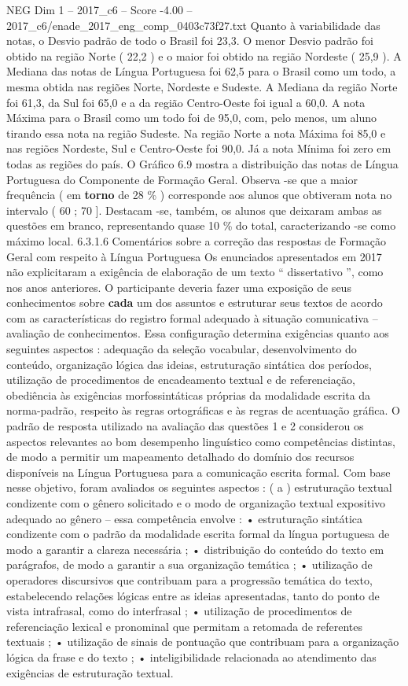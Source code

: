 \begin{textsample}{NEG Dim 1 – 2017\_c6 – Score -4.00 – 2017\_c6/enade\_2017\_eng\_comp\_0403c73f27.txt}
Quanto à variabilidade das notas, o Desvio padrão de todo o Brasil foi 23,3.
O menor Desvio padrão foi obtido na região Norte ( 22,2 ) e o maior foi obtido na região Nordeste ( 25,9 ).
A Mediana das notas de Língua Portuguesa foi 62,5 para o Brasil como um todo, a mesma obtida nas regiões Norte, Nordeste e Sudeste.
A Mediana da região Norte foi 61,3, da Sul foi 65,0 e a da região Centro-Oeste foi igual a 60,0.
A nota Máxima para o Brasil como um todo foi de 95,0, com, pelo menos, um aluno tirando essa nota na região Sudeste.
Na região Norte a nota Máxima foi 85,0 e nas regiões Nordeste, Sul e Centro-Oeste foi 90,0.
Já a nota Mínima foi zero em todas as regiões do país.
O Gráfico 6.9 mostra a distribuição das notas de Língua Portuguesa do Componente de Formação Geral.
Observa -se que a maior frequência ( em \textbf{torno} de 28 \% ) corresponde aos alunos que obtiveram nota no intervalo ( 60 ; 70 ].
Destacam -se, também, os alunos que deixaram ambas as questões em branco, representando quase 10 \% do total, caracterizando -se como máximo local. 6.3.1.6 Comentários sobre a correção das respostas de Formação Geral com respeito à Língua Portuguesa Os enunciados apresentados em 2017 não explicitaram a exigência de elaboração de um texto “ dissertativo ”, como nos anos anteriores.
O participante deveria fazer uma exposição de seus conhecimentos sobre \textbf{cada} um dos assuntos e estruturar seus textos de acordo com as características do registro formal adequado à situação comunicativa – avaliação de conhecimentos.
Essa configuração determina exigências quanto aos seguintes aspectos : adequação da seleção vocabular, desenvolvimento do conteúdo, organização lógica das ideias, estruturação sintática dos períodos, utilização de procedimentos de encadeamento textual e de referenciação, obediência às exigências morfossintáticas próprias da modalidade escrita da norma-padrão, respeito às regras ortográficas e às regras de acentuação gráfica.
O padrão de resposta utilizado na avaliação das questões 1 e 2 considerou os aspectos relevantes ao bom desempenho linguístico como competências distintas, de modo a permitir um mapeamento detalhado do domínio dos recursos disponíveis na Língua Portuguesa para a comunicação escrita formal.
Com base nesse objetivo, foram avaliados os seguintes aspectos : ( a ) estruturação textual condizente com o gênero solicitado e o modo de organização textual expositivo adequado ao gênero – essa competência envolve : • estruturação sintática condizente com o padrão da modalidade escrita formal da língua portuguesa de modo a garantir a clareza necessária ; • distribuição do conteúdo do texto em parágrafos, de modo a garantir a sua organização temática ; • utilização de operadores discursivos que contribuam para a progressão temática do texto, estabelecendo relações lógicas entre as ideias apresentadas, tanto do ponto de vista intrafrasal, como do interfrasal ; • utilização de procedimentos de referenciação lexical e pronominal que permitam a retomada de referentes textuais ; • utilização de sinais de pontuação que contribuam para a organização lógica da frase e do texto ; • inteligibilidade relacionada ao atendimento das exigências de estruturação textual.

\end{textsample}
